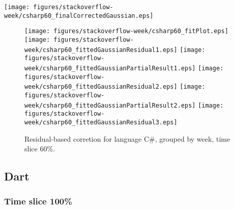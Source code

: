 \begin{center}
{\texttt{[image: figures/stackoverflow-week/csharp60\_finalCorrectedGaussian.eps]}}
\end{center}

\FloatBarrier

\begin{figure}[t]
\centering
{}
{\texttt{[image: figures/stackoverflow-week/csharp60\_fitPlot.eps]}}
{\texttt{[image: figures/stackoverflow-week/csharp60\_fittedGaussianResidual1.eps]}}
{\texttt{[image: figures/stackoverflow-week/csharp60\_fittedGaussianPartialResult1.eps]}}
{\texttt{[image: figures/stackoverflow-week/csharp60\_fittedGaussianResidual2.eps]}}
{\texttt{[image: figures/stackoverflow-week/csharp60\_fittedGaussianPartialResult2.eps]}}
{\texttt{[image: figures/stackoverflow-week/csharp60\_fittedGaussianResidual3.eps]}}
\caption{Residual-based corretion for language C\#, grouped by week, time slice 60\%.}
\end{figure}


\FloatBarrier


\subsection{Dart}

\subsubsection{Time slice 100\%}

